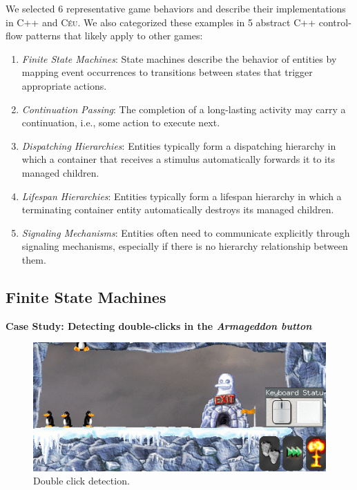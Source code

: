 \documentclass{vgtc}                          %
\newcommand{\CEU}{\textsc{C\'{e}u}\xspace}
\begin{document}
We selected 6 representative game behaviors and describe their
implementations in C++ and \CEU.
We also categorized these examples in 5 abstract C++ control-flow patterns that
likely apply to other games:

\begin{enumerate}
\item \emph{Finite State Machines}:
    State machines describe the behavior of entities by mapping event
    occurrences to transitions between states that trigger appropriate actions.
\item \emph{Continuation Passing}:
    The completion of a long-lasting activity may carry a continuation, i.e.,
    some action to execute next.
\item \emph{Dispatching Hierarchies}:
    Entities typically form a dispatching hierarchy in which a container that
    receives a stimulus automatically forwards it to its managed children.
\item \emph{Lifespan Hierarchies}:
    Entities typically form a lifespan hierarchy in which a terminating
    container entity automatically destroys its managed children.
\item \emph{Signaling Mechanisms}:
    Entities often need to communicate explicitly through signaling mechanisms,
    especially if there is no hierarchy relationship between them.
\end{enumerate}

\subsection{Finite State Machines}

\textbf{Case Study: Detecting double-clicks in the \emph{Armageddon button}}

\begin{figure}[t]
\centering
\includegraphics[width=\columnwidth]{double-click-opt}
\caption{Double click detection.
\label{fig.armageddon}
}
\end{figure}
\end{document}
